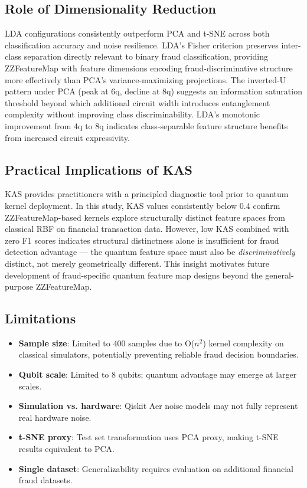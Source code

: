 \documentclass[journal]{IEEEtran}
\begin{document}
\subsection{Role of Dimensionality Reduction}
LDA configurations consistently outperform PCA and t-SNE 
across both classification accuracy and noise resilience. 
LDA's Fisher criterion preserves inter-class separation 
directly relevant to binary fraud classification, providing 
ZZFeatureMap with feature dimensions encoding fraud-discriminative 
structure more effectively than PCA's variance-maximizing 
projections. The inverted-U pattern under PCA (peak at 6q, 
decline at 8q) suggests an information saturation threshold 
beyond which additional circuit width introduces entanglement 
complexity without improving class discriminability. LDA's 
monotonic improvement from 4q to 8q indicates class-separable 
feature structure benefits from increased circuit expressivity.

\subsection{Practical Implications of KAS}
KAS provides practitioners with a principled diagnostic tool 
prior to quantum kernel deployment. In this study, KAS values 
consistently below 0.4 confirm ZZFeatureMap-based kernels 
explore structurally distinct feature spaces from classical 
RBF on financial transaction data. However, low KAS combined 
with zero F1 scores indicates structural distinctness alone 
is insufficient for fraud detection advantage --- the quantum 
feature space must also be \textit{discriminatively} distinct, 
not merely geometrically different. This insight motivates 
future development of fraud-specific quantum feature map 
designs beyond the general-purpose ZZFeatureMap.

\subsection{Limitations}
\begin{itemize}
    \item \textbf{Sample size}: Limited to 400 samples due 
    to O($n^2$) kernel complexity on classical simulators, 
    potentially preventing reliable fraud decision boundaries.
    \item \textbf{Qubit scale}: Limited to 8 qubits; 
    quantum advantage may emerge at larger scales.
    \item \textbf{Simulation vs. hardware}: Qiskit Aer noise 
    models may not fully represent real hardware noise.
    \item \textbf{t-SNE proxy}: Test set transformation uses 
    PCA proxy, making t-SNE results equivalent to PCA.
    \item \textbf{Single dataset}: Generalizability requires 
    evaluation on additional financial fraud datasets.
\end{itemize}
\end{document}
